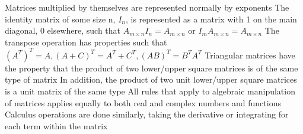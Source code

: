 \documentclass[11 pt, twoside]{article}
\newenvironment{outline*}
{
	\begin{outline}[enumerate]
	}
	{\end{outline}
}
\begin{document}
\begin{outline*}
\2 Matrices multiplied by themselves are represented normally by exponents
\1 The identity matrix of some size n, $I_n$, is represented as a matrix with 1 on the main diagonal, 0 elsewhere, such that $A_{m \times n}I_n = A_{m \times n}$ or $I_mA_{m \times n} = A_{m \times n}$
\1 The transpose operation has properties such that $(A^T)^T = A, (A + C)^T = A^T + C^T, (AB)^T = B^TA^T$
\1 Triangular matrices have the property that the product of two lower/upper square matrices is of the same type of matrix
\2 In addition, the product of two unit lower/upper square matrices is a unit matrix of the same type
\1 All rules that apply to algebraic manipulation of matrices applies equally to both real and complex numbers and functions
\2 Calculus operations are done similarly, taking the derivative or integrating for each term within the matrix
\end{outline*}
\end{document}
